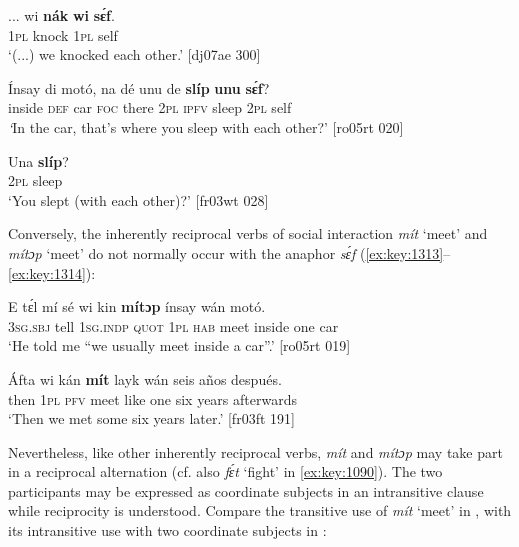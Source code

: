 \ea%
    \label{ex:key:1310}
    \gll \op...\cp{}  wi  \textbf{nák}    \textbf{wi}  \textbf{sɛ́f}.\\
  {} \textsc{1pl}  knock  \textsc{1pl}  self\\

\glt ‘(...) we knocked each other.’ [dj07ae 300]
\z


\ea%
    \label{ex:key:1311}
    \gll \'{I}nsay  di  motó,  na  dé    unu  de  \textbf{slíp}    \textbf{unu}  \textbf{sɛ́f}?\\
inside  \textsc{def}  car    \textsc{foc}  there  \textsc{2pl}  \textsc{ipfv}  sleep  \textsc{2pl}  self\\

\glt \textit{‘}In the car, that’s where you sleep with each other?’ [ro05rt 020]
\z


\ea%
    \label{ex:key:1312}
    \gll Una    \textbf{slíp}?\\
\textsc{2pl}    sleep\\

\glt ‘You slept (with each other)?’ [fr03wt 028]
\z

Conversely, the inherently reciprocal verbs of social interaction \textit{mít} ‘meet’ and \textit{mítɔp} ‘meet’ do not normally occur with the anaphor \textit{sɛ́f} (\ref{ex:key:1313}–\ref{ex:key:1314}): 


\ea%
    \label{ex:key:1313}
    \gll E    tɛ́l  mí    sé    wi  kin  \textbf{mítɔp}  ínsay  wán    motó.\\
\textsc{3sg.sbj}  tell  \textsc{1sg.indp}  \textsc{quot}    \textsc{1pl}  \textsc{hab}  meet  inside  one    car\\

\glt ‘He told me “we usually meet inside a car”.’ [ro05rt 019]
\z


\ea%
    \label{ex:key:1314}
    \gll \'{A}fta    wi  kán  \textbf{mít}    layk    wán  seis    años  después.\\
then  \textsc{1pl}  \textsc{pfv}  meet  like    one  six    years  afterwards\\

\glt ‘Then we met some six years later.’ [fr03ft 191]
\z

Nevertheless, like other inherently reciprocal verbs, \textit{mít} and \textit{mítɔp} may take part in a reciprocal alternation (cf. also \textit{fɛ́t} ‘fight’ in \ref{ex:key:1090}). The two participants may be expressed as coordinate subject{\fff}s in an intransitive clause while reciprocity is understood. Compare the transitive use of \textit{mít} ‘meet’ in , with its intransitive use with two coordinate subjects in :



